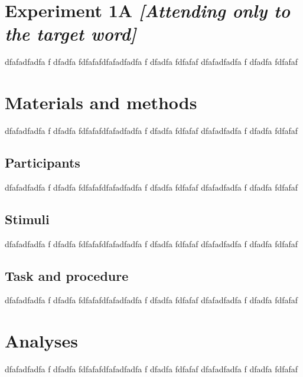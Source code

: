 \documentclass[a4paper, nobind]{templates/ociamthesis}
\begin{document}
\hypertarget{experiment-1a-attending-only-to-the-target-word}{%
\section{\texorpdfstring{Experiment 1A \emph{{[}Attending only to the target word{]}}}{Experiment 1A {[}Attending only to the target word{]}}}\label{experiment-1a-attending-only-to-the-target-word}}

dfafadfadfa f
dfadfa
fdfafafdfafadfadfa f
dfadfa
fdfafaf
dfafadfadfa f
dfadfa
fdfafaf

\hypertarget{materials-and-methods}{%
\section{Materials and methods}\label{materials-and-methods}}

dfafadfadfa f
dfadfa
fdfafafdfafadfadfa f
dfadfa
fdfafaf
dfafadfadfa f
dfadfa
fdfafaf

\hypertarget{participants}{%
\subsection{Participants}\label{participants}}

dfafadfadfa f
dfadfa
fdfafafdfafadfadfa f
dfadfa
fdfafaf
dfafadfadfa f
dfadfa
fdfafaf

\hypertarget{stimuli}{%
\subsection{Stimuli}\label{stimuli}}

dfafadfadfa f
dfadfa
fdfafafdfafadfadfa f
dfadfa
fdfafaf
dfafadfadfa f
dfadfa
fdfafaf

\hypertarget{task-and-procedure}{%
\subsection{Task and procedure}\label{task-and-procedure}}

dfafadfadfa f
dfadfa
fdfafafdfafadfadfa f
dfadfa
fdfafaf
dfafadfadfa f
dfadfa
fdfafaf

\hypertarget{analyses}{%
\section{Analyses}\label{analyses}}

dfafadfadfa f
dfadfa
fdfafafdfafadfadfa f
dfadfa
fdfafaf
dfafadfadfa f
dfadfa
fdfafaf
\end{document}
